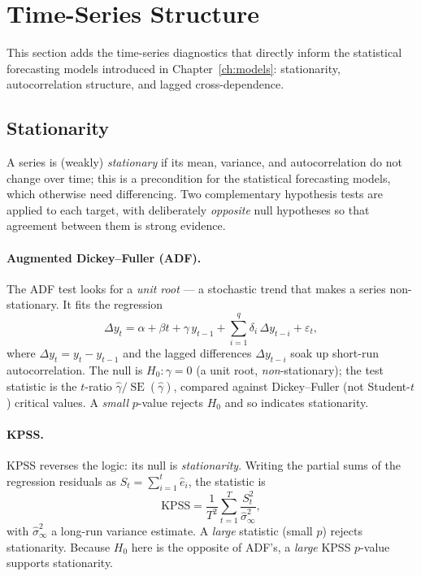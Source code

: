 \documentclass[12pt,a4paper,oneside]{report}
\begin{document}
\section{Time-Series Structure}
\label{sec:eda-tsstruct}
This section adds the time-series diagnostics that directly inform the statistical
forecasting models introduced in Chapter~\ref{ch:models}: stationarity,
autocorrelation structure, and lagged cross-dependence.

\subsection{Stationarity}
A series is (weakly) \emph{stationary} if its mean, variance, and autocorrelation
do not change over time; this is a precondition for the statistical forecasting
models, which otherwise need differencing. Two complementary hypothesis
tests are applied to each target, with deliberately \emph{opposite} null
hypotheses so that agreement between them is strong evidence.

\paragraph{Augmented Dickey--Fuller (ADF).}
The ADF test looks for a \emph{unit root} --- a stochastic trend that makes a
series non-stationary. It fits the regression
\begin{equation}
  \Delta y_t = \alpha + \beta t + \gamma\,y_{t-1}
             + \sum_{i=1}^{q}\delta_i\,\Delta y_{t-i} + \varepsilon_t ,
  \label{eq:eda-adf}
\end{equation}
where $\Delta y_t = y_t - y_{t-1}$ and the lagged differences $\Delta y_{t-i}$
soak up short-run autocorrelation. The null is $H_0\!:\gamma=0$ (a unit root,
\emph{non}-stationary); the test statistic is the $t$-ratio
$\hat\gamma/\operatorname{SE}(\hat\gamma)$, compared against Dickey--Fuller (not
Student-$t$) critical values. A \emph{small} $p$-value rejects $H_0$ and so
indicates stationarity.

\paragraph{KPSS.}
KPSS reverses the logic: its null is \emph{stationarity}. Writing the partial
sums of the regression residuals as $S_t=\sum_{i=1}^{t}\hat e_i$, the statistic is
\begin{equation}
  \mathrm{KPSS} = \frac{1}{T^{2}}\sum_{t=1}^{T}\frac{S_t^{2}}{\hat\sigma^2_{\infty}},
  \label{eq:eda-kpss}
\end{equation}
with $\hat\sigma^2_{\infty}$ a long-run variance estimate. A \emph{large}
statistic (small $p$) rejects stationarity. Because $H_0$ here is the opposite of
ADF's, a \emph{large} KPSS $p$-value supports stationarity.
\end{document}
